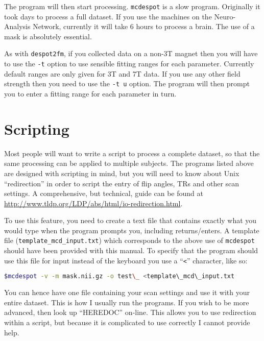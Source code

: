 \documentclass{report}
\begin{document}
The program will then start processing. \texttt{mcdespot} is a slow program. Originally it took days to process a full dataset. If you use the machines on the Neuro-Analysis Network, currently it will take 6 hours to process a brain. The use of a mask is absolutely essential.

As with \texttt{despot2fm}, if you collected data on a non-3T magnet then you will have to use the \texttt{-t} option to use sensible fitting ranges for each parameter. Currently default ranges are only given for 3T and 7T data. If you use any other field strength then you need to use the \texttt{-t u} option. The program will then prompt you to enter a fitting range for each parameter in turn.

\section{Scripting}\label{scripting}

Most people will want to write a script to process a complete dataset, so that the same processing can be applied to multiple subjects. The programs listed above are designed with scripting in mind, but you will need to know about Unix ``redirection'' in order to script the entry of flip angles, TRs and other scan settings. A comprehensive, but technical, guide can be found at \url{http://www.tldp.org/LDP/abs/html/io-redirection.html}.

To use this feature, you need to create a text file that contains exactly what you would type when the program prompts you, including returns/enters. A template file (\texttt{template\_mcd\_input.txt}) which corresponds to the above use of \texttt{mcdespot} should have been provided with this manual. To specify that the program should use this file for input instead of the keyboard you use a ``\texttt{<}'' character, like so:

\begin{lstlisting}[language=sh]
$mcdespot -v -m mask.nii.gz -o test\_ <template\_mcd\_input.txt
\end{lstlisting}

You can hence have one file containing your scan settings and use it with your entire dataset. This is how I usually run the programs. If you wish to be more advanced, then look up ``HEREDOC'' on-line. This allows you to use redirection within a script, but because it is complicated to use correctly I cannot provide help.
\end{document}
